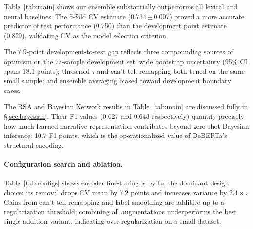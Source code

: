 \documentclass[11pt]{article}
\begin{document}
Table~\ref{tab:main} shows our ensemble substantially outperforms all
lexical and neural baselines.
The 5-fold CV estimate (0.734\,$\pm$\,0.007) proved a more accurate
predictor of test performance (0.750) than the development point estimate
(0.829), validating CV as the model selection criterion.

The 7.9-point development-to-test gap reflects three compounding sources
of optimism on the 77-sample development set: wide bootstrap uncertainty
(95\% CI spans 18.1 points); threshold $\tau$ and can't-tell remapping
both tuned on the same small sample; and ensemble averaging biased toward
development boundary cases.

The RSA and Bayesian Network results in Table~\ref{tab:main} are
discussed fully in \S\ref{sec:bayesian}.
Their F1 values (0.627 and 0.643 respectively) quantify precisely how much
learned narrative representation contributes beyond zero-shot Bayesian
inference: 10.7 F1 points, which is the operationalized value of
DeBERTa's structural encoding.

\paragraph{Configuration search and ablation.}
Table~\ref{tab:configs} shows encoder fine-tuning is by far the dominant
design choice: its removal drops CV mean by 7.2 points and increases
variance by $2.4\times$.
Gains from can't-tell remapping and label smoothing are additive up to
a regularization threshold; combining all augmentations underperforms
the best single-addition variant, indicating over-regularization on a
small dataset.
\end{document}
